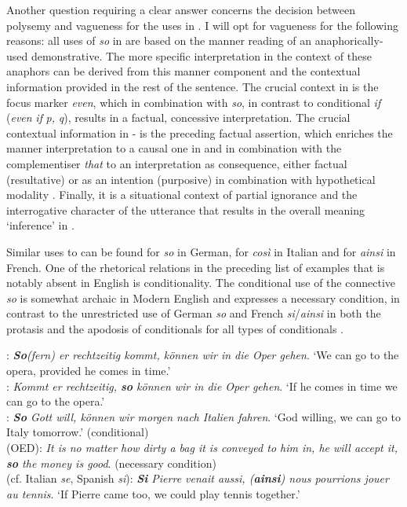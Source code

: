 \documentclass[output=paper,colorlinks,citecolor=brown]{langscibook}
\begin{document}
Another question requiring a clear answer concerns the decision between polysemy and vagueness for the uses in . I will opt for vagueness for the following reasons: all uses of \textit{so} in  are based on the manner reading of an anaphorically-used demonstrative. The more specific interpretation in the context of these anaphors can be derived from this manner component and the contextual information provided in the rest of the sentence. The crucial context in  is the focus marker \textit{even}, which in combination with \textit{so}, in contrast to conditional \textit{if} (\textit{even} \textit{if} \textit{p,} \textit{q}), results in a factual, concessive interpretation. The crucial contextual information in - is the preceding factual assertion, which enriches the manner interpretation to a causal one in  and in combination with the complementiser \textit{that} to an interpretation as consequence, either factual (resultative) or as an intention (purposive) in combination with hypothetical modality . Finally, it is a situational context of partial ignorance and the interrogative character of the utterance that results in the overall meaning ‘inference’ in .

Similar uses to  can be found for \textit{so} in German, for \textit{così} in Italian and for \textit{ainsi} in French. One of the rhetorical relations in the preceding list of examples that is notably absent in English is conditionality. The conditional use of the connective \textit{so} is somewhat archaic in Modern English and expresses a necessary condition, in contrast to the unrestricted use of German \textit{so} and French \textit{si}/\textit{ainsi} in both the protasis and the apodosis of conditionals for all types of conditionals .

\ea\label{ex:koenig:17}
: \textit{\textbf{So}(fern) er rechtzeitig kommt, können wir in die Oper gehen}. ‘We can go to the opera, provided he comes in time.’\\
: \textit{Kommt er rechtzeitig, \textbf{so} können wir in die Oper gehen}. ‘If he comes in time we can go to the opera.’\\
: \textit{\textbf{So} Gott will, können wir morgen nach Italien fahren}. ‘God willing, we can go to Italy tomorrow.’ (conditional)\\
 (OED): \textit{It is no matter how dirty a bag it is conveyed to him in, he will accept it, \textbf{so} the money is good}. (necessary condition)\\
 (cf. Italian \textit{se}, Spanish \textit{si}): \textit{\textbf{Si} Pierre venait aussi, (\textbf{ainsi}) nous pourrions jouer au tennis}. ‘If Pierre came too, we could play tennis together.’\\
\z
\z
\end{document}

